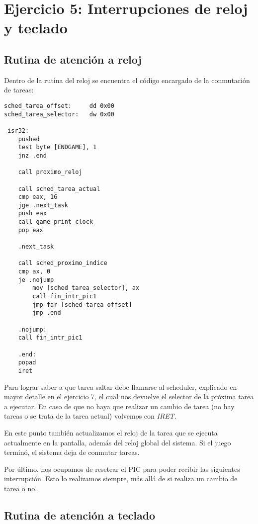 \section{Ejercicio 5: Interrupciones de reloj y teclado}

	\subsection{Rutina de atención a reloj}

	Dentro de la rutina del reloj se encuentra el código encargado de la conmutación de tareas:

	\begin{lstlisting}
sched_tarea_offset:     dd 0x00
sched_tarea_selector:   dw 0x00

_isr32:
    pushad
    test byte [ENDGAME], 1
    jnz .end

    call proximo_reloj

    call sched_tarea_actual
    cmp eax, 16 
    jge .next_task
    push eax
    call game_print_clock
    pop eax

    .next_task

    call sched_proximo_indice
    cmp ax, 0
    je .nojump
        mov [sched_tarea_selector], ax
        call fin_intr_pic1
        jmp far [sched_tarea_offset]
        jmp .end

    .nojump:
    call fin_intr_pic1

    .end:
    popad
    iret
	\end{lstlisting}

	Para lograr saber a que tarea saltar debe llamarse al scheduler, explicado en mayor detalle en el ejercicio 7, el cual nos devuelve el selector de la próxima tarea a ejecutar. En caso de que no haya que realizar un cambio de tarea (no hay tareas o se trata de la tarea actual) volvemos con \textit{IRET}.

	En este punto también actualizamos el reloj de la tarea que se ejecuta actualmente en la pantalla, además del reloj global del sistema. Si el juego terminó, el sistema deja de conmutar tareas.

	Por último, nos ocupamos de resetear el PIC para poder recibir las siguientes interrupción. Esto lo realizamos siempre, más allá de si realiza un cambio de tarea o no.

	\subsection{Rutina de atención a teclado}

